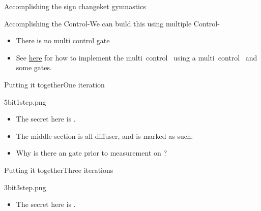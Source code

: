 {\begin{frame}{Accomplishing the sign change}{ket gymnastics}
\end{frame}
\begin{frame}{Accomplishing the Control-\PauliZ}{We can build this using multiple Control-\PauliX{}}

\begin{itemize}
    \item There is no multi control \PauliZ{} gate
    \item 
See \href{https://learn.qiskit.org/course/ch-gates/basic-circuit-identities\#c-from-cnot}{here} for how to implement the multi~control~\PauliZ{} using a multi~control~\PauliX{} and some \Hadamard{} gates.
\end{itemize}
\end{frame}
}

\begin{frame}{Putting it together}{One iteration}

\Vskip{-4em}\begin{center}
\begin{Pixture}[width=0.97\textwidth]{26}{5bit1step.png}
\end{Pixture}
\end{center}
\begin{itemize}
    \item The secret here is .
    \item The middle section is all diffuser, and is marked as such.
    \item Why is there an \Hadamard{} gate prior to measurement on ?
\end{itemize}
    
\end{frame}

\begin{frame}{Putting it together}{Three iterations}

\Vskip{-4em}\begin{center}
\begin{Pixture}[width=0.8\textwidth]{26}{3bit3step.png}
\end{Pixture}
\end{center}
\begin{itemize}
    \item The secret here is .
\end{itemize}
    
\end{frame}

